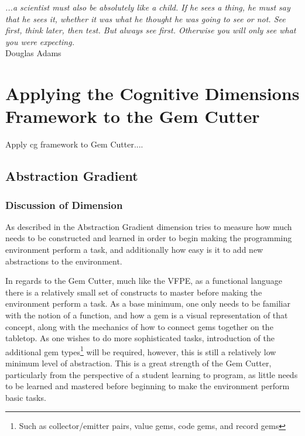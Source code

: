\label{chapter:Exp}

\begin{flushright}
\textit{...a scientist must also be absolutely like a child.  If he sees a thing, he must say that he sees it, whether it was what he thought he was going to see or not.  See first, think later, then test.  But always see first.  Otherwise you will only see what you were expecting.}
\\
Douglas Adams \cite{Adams84} \\
\end{flushright}

\section{Applying the Cognitive Dimensions Framework to the Gem Cutter}

Apply cg framework to Gem Cutter....

\subsection{Abstraction Gradient}

\subsubsection{Discussion of Dimension}

As described in  the Abstraction Gradient dimension tries to measure how much needs to be constructed
and learned in order to begin making the programming environment perform a task, and additionally how easy is it to add new abstractions to the environment.

In regards to the Gem Cutter, much like the VFPE, as a functional language there is a relatively small set of constructs to master before making the environment perform a task.  As a base minimum, one only needs to be familiar with the notion of a function, and how a gem is a visual representation of that concept, along with the mechanics of how to connect gems together on the tabletop.  As one wishes to do more sophisticated tasks, introduction of the additional gem types\footnote{Such as collector/emitter pairs, value gems, code gems, and record gems} will be required, however, this is still a relatively low minimum level of abstraction.  This is a great strength of the Gem Cutter, particularly from the perspective of a student learning to program, as little needs to be learned and mastered before beginning to make the environment perform basic tasks.

